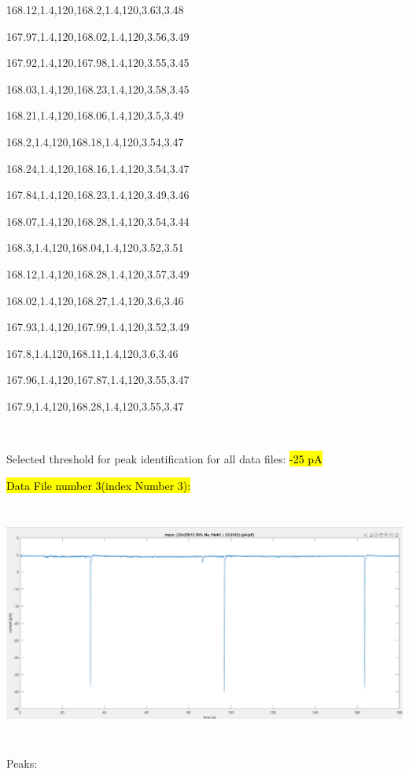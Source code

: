 168.12,1.4,120,168.2,1.4,120,3.63,3.48

167.97,1.4,120,168.02,1.4,120,3.56,3.49

167.92,1.4,120,167.98,1.4,120,3.55,3.45

168.03,1.4,120,168.23,1.4,120,3.58,3.45

168.21,1.4,120,168.06,1.4,120,3.5,3.49

168.2,1.4,120,168.18,1.4,120,3.54,3.47

168.24,1.4,120,168.16,1.4,120,3.54,3.47

167.84,1.4,120,168.23,1.4,120,3.49,3.46

168.07,1.4,120,168.28,1.4,120,3.54,3.44

168.3,1.4,120,168.04,1.4,120,3.52,3.51

168.12,1.4,120,168.28,1.4,120,3.57,3.49

168.02,1.4,120,168.27,1.4,120,3.6,3.46

167.93,1.4,120,167.99,1.4,120,3.52,3.49

167.8,1.4,120,168.11,1.4,120,3.6,3.46

167.96,1.4,120,167.87,1.4,120,3.55,3.47

167.9,1.4,120,168.28,1.4,120,3.55,3.47



Selected threshold for peak identification for all data files: \hl{-25
pA}

\hl{Data File number 3(index Number 3):}

\includegraphics[width=6.5in,height=3.13889in]{media/image33.png}

Peaks:

